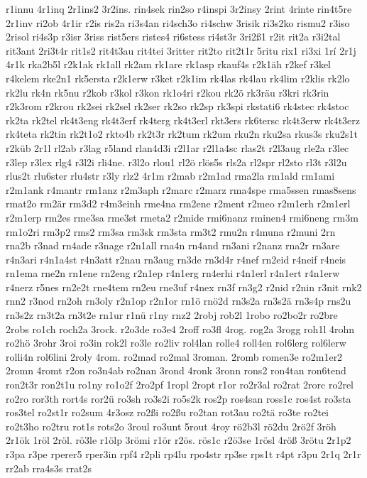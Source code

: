 {r1innu
4r1inq
2r1ins2
3r2ins.
rin4sek
rin2so
r4inspi
3r2insy
2rint
4rinte
rin4t5re
2r1inv
ri2ob
4r1ir
r2is
ris2a
ri3s4an
ri4sch3o
ri4schw
3risik
ri3s2ko
rismu2
r3iso
2risol
ri4s3p
r3isr
3riss
rist5ers
ristes4
ri6stess
ri4st3r
3ri2ß1
r2it
rit2a
r3i2tal
rit3ant
2ri3t4r
rit1s2
rit4t3au
rit4tei
3ritter
rit2to
rit2t1r
5ritu
rix1
ri3xi
1rí
2r1j
4r1k
rka2b5l
r2k1ak
rk1all
rk2am
rk1are
rk1asp
rkauf4s
r2k1äh
r2kef
r3kel
r4kelem
rke2n1
rk5ersta
r2k1erw
r3ket
r2k1im
rk4las
rk4lau
rk4lim
r2klis
rk2lo
rk2lu
rk4n
rk5nu
r2kob
r3kol
r3kon
rk1o4ri
r2kou
rk2ö
rk3räu
r3kri
rk3rin
r2k3rom
r2krou
rk2sei
rk2sel
rk2ser
rk2so
rk2sp
rk3spi
rkstati6
rk4stec
rk4stoc
rk2ta
rk2tel
rk4t3eng
rk4t3erf
rk4terg
rk4t3erl
rkt3ers
rk6tersc
rk4t3erw
rk4t3erz
rk4teta
rk2tin
rk2t1o2
rkto4b
rk2t3r
rk2tum
rk2um
rku2n
rku2sa
rkus3s
rku2s1t
r2küb
2r1l
rl2ab
r3lag
r5land
rlan4d3i
r2l1ar
r2l1a4sc
rlas2t
r2l3aug
rle2a
r3lec
r3lep
r3lex
rlg4
r3l2i
rli4ne.
r3l2o
rlou1
rl2ö
rlös5s
rls2a
rl2spr
rl2sto
rl3t
r3l2u
rlus2t
rlu6ster
rlu4str
r3ly
rlz2
4r1m
r2mab
r2m1ad
rma2la
rm1ald
rm1ami
r2m1ank
r4mantr
rm1anz
r2m3aph
r2marc
r2marz
rma4spe
rma5ssen
rmas8sens
rmat2o
rm2är
rm3d2
r4m3einh
rme4na
rm2ene
r2ment
r2meo
r2m1erh
r2m1erl
r2m1erp
rm2es
rme3sa
rme3st
rmeta2
r2mide
rmi6nanz
rminen4
rmi6neng
rm3m
rm1o2ri
rm3p2
rms2
rm3sa
rm3sk
rm3sta
rm3t2
rmu2n
r4muna
r2muni
2rn
rna2b
r3nad
rn4ade
r3nage
r2n1all
rna4n
rn4and
rn3ani
r2nanz
rna2r
rn3are
r4n3ari
r4n1a4st
r4n3att
r2nau
rn3aug
rn3de
rn3d4r
r4nef
rn2eid
r4neif
r4neis
rn1ema
rne2n
rn1ene
rn2eng
r2n1ep
r4n1erg
rn4erhi
r4n1erl
r4n1ert
r4n1erw
r4nerz
r5nes
rn2e2t
rne4tem
rn2eu
rne3uf
r4nex
rn3f
rn3g2
r2nid
r2nin
r3nit
rnk2
rnn2
r3nod
rn2oh
rn3oly
r2n1op
r2n1or
rn1ö
rnö2d
rn3s2a
rn3s2ä
rn3s4p
rns2u
rn3s2z
rn3t2a
rn3t2e
rn1ur
r1nü
r1ny
rnz2
2robj
rob2l
1robo
ro2bo2r
ro2bre
2robs
ro1ch
roch2a
3rock.
r2o3de
ro3e4
2roff
ro3fl
4rog.
rog2a
3rogg
roh1l
4rohn
ro2hö
3rohr
3roi
ro3in
rok2l
ro3le
ro2liv
rol4lan
rolle4
roll4en
rol6lerg
rol6lerw
rolli4n
rol6lini
2roly
4rom.
ro2mad
ro2mal
3roman.
2romb
romen3e
ro2m1er2
2romn
4romt
r2on
ro3n4ab
ro2nan
3rond
4ronk
3ronn
rons2
ron4tan
ron6tend
ron2t3r
ron2t1u
ro1ny
ro1o2f
2ro2pf
1ropl
2ropt
r1or
ro2r3al
ro2rat
2rorc
ro2rel
ro2ro
ror3th
rort4s
ror2ü
ro3sh
ro3s2i
ro5s2k
ros2p
ros4san
ross1c
ros4st
ro3sta
ros3tel
ro2st1r
ro2sum
4r3osz
ro2ßi
ro2ßu
ro2tan
rot3au
ro2tä
ro3te
ro2tei
ro2t3ho
ro2tru
rot1s
rots2o
3roul
ro3unt
5rout
4roy
rö2b3l
rö2du
2rö2f
3röh
2r1ök
1röl
2röl.
rö3le
r1ölp
3römi
r1ör
r2ös.
rös1c
r2ö3se
1rösl
4röß
3rötu
2r1p2
r3pa
r3pe
rperer5
rper3in
rpf4
r2pli
rp4lu
rpo4str
rp3se
rps1t
r4pt
r3pu
2r1q
2r1r
rr2ab
rra4s3s
rrat2s
}
